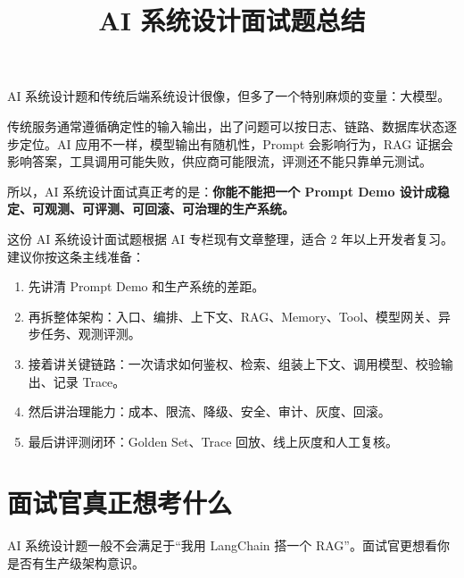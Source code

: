 \documentclass[9pt,a4paper,twocolumn]{ctexart}
\begin{document}
\title{AI 系统设计面试题总结}
\date{}
\maketitle
{}

AI 系统设计题和传统后端系统设计很像，但多了一个特别麻烦的变量：大模型。



传统服务通常遵循确定性的输入输出，出了问题可以按日志、链路、数据库状态逐步定位。AI 应用不一样，模型输出有随机性，Prompt 会影响行为，RAG 证据会影响答案，工具调用可能失败，供应商可能限流，评测还不能只靠单元测试。



所以，AI 系统设计面试真正考的是：\textbf{你能不能把一个 Prompt Demo 设计成稳定、可观测、可评测、可回滚、可治理的生产系统。}



这份 AI 系统设计面试题根据 AI 专栏现有文章整理，适合 2 年以上开发者复习。建议你按这条主线准备：


\begin{enumerate}[itemsep=1pt, topsep=2pt]
  \item 先讲清 Prompt Demo 和生产系统的差距。
  \item 再拆整体架构：入口、编排、上下文、RAG、Memory、Tool、模型网关、异步任务、观测评测。
  \item 接着讲关键链路：一次请求如何鉴权、检索、组装上下文、调用模型、校验输出、记录 Trace。
  \item 然后讲治理能力：成本、限流、降级、安全、审计、灰度、回滚。
  \item 最后讲评测闭环：Golden Set、Trace 回放、线上灰度和人工复核。
\end{enumerate}


\section*{面试官真正想考什么}


AI 系统设计题一般不会满足于“我用 LangChain 搭一个 RAG”。面试官更想看你是否有生产级架构意识。
\end{document}
